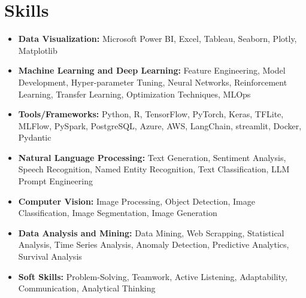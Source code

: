\documentclass[11pt,a4paper,sans]{moderncv}
\begin{document}
\section{Skills}
{\begin{itemize}[label=\textbullet]
\item {\textbf{Data Visualization:} Microsoft Power BI, Excel, Tableau, Seaborn, Plotly, Matplotlib}
\item {\textbf{Machine Learning and Deep Learning:} Feature Engineering, Model Development, 
Hyper-parameter Tuning, 
Neural Networks,
Reinforcement Learning,
Transfer Learning,
Optimization Techniques,
MLOps}
\item {\textbf{Tools/Frameworks:} 
Python,
R,
TensorFlow,
PyTorch,
Keras,
TFLite,
MLFlow,
PySpark,
PostgreSQL,
Azure,
AWS,
LangChain,
streamlit,
Docker,
Pydantic

}
\item {\textbf{Natural Language Processing:} Text Generation,
Sentiment Analysis,
Speech Recognition,
Named Entity Recognition,
Text Classification, LLM Prompt Engineering}
\item {\textbf{Computer Vision:} Image Processing, Object Detection, Image Classification, Image Segmentation, Image Generation}
\item {\textbf{Data Analysis and Mining:} Data Mining,
Web Scrapping,
Statistical Analysis,
Time Series Analysis,
Anomaly Detection,
Predictive Analytics,
Survival Analysis}
\item {\textbf{Soft Skills:} Problem-Solving, Teamwork, Active Listening, Adaptability, Communication, Analytical Thinking}
\end{itemize}}
\end{document}
